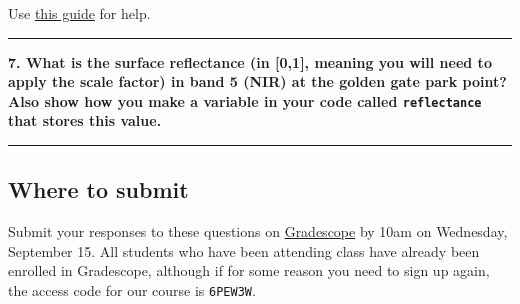 \documentclass[
]{article}
\begin{document}
Use \href{https://developers.google.com/earth-engine/reducers_reduce_region}{this guide} for help.

\begin{center}\rule{0.5\linewidth}{0.5pt}\end{center}

\textbf{7. What is the surface reflectance (in {[}0,1{]}, meaning you will need to apply the scale factor) in band 5 (NIR) at the golden gate park point? Also show how you make a variable in your code called \texttt{reflectance} that stores this value.}

\begin{center}\rule{0.5\linewidth}{0.5pt}\end{center}

\hypertarget{where-to-submit-1}{%
\subsection*{Where to submit}\label{where-to-submit-1}}

Submit your responses to these questions on \href{https://www.gradescope.com/courses/293173/assignments/1446622/submissions}{Gradescope} by 10am on Wednesday, September 15. All students who have been attending class have already been enrolled in Gradescope, although if for some reason you need to sign up again, the access code for our course is \texttt{6PEW3W}.
\end{document}
